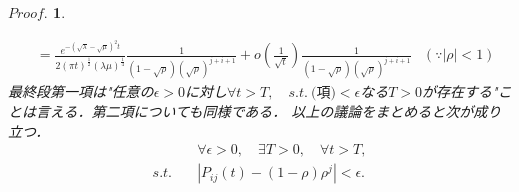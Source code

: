 \documentclass[a4j,papersize,disablejfam,slide,14pt]{jsarticle}
\newtheorem{Proof}{$Proof.$}
\def\exp#1{e^{#1}} %
\begin{document}
\begin{Proof}
\begin{description}
\begin{align}
                    &= \frac{ \exp{-(\sqrt{\lambda}-\sqrt{\mu})^2 t} }{ 2(\pi t)^\frac{1}{2} (\lambda \mu)^\frac{1}{4} } \frac{1}{(1-\sqrt{\rho})(\sqrt{\rho})^{j+i+1}} 
                    	+ o\left( \frac{1}{\sqrt{t}} \right) \frac{1}{(1-\sqrt{\rho})(\sqrt{\rho})^{j+i+1}} & (\because |\rho| < 1)
                \end{align}
                最終段第一項は"任意の$\epsilon > 0$に対し$\forall t > T,\quad s.t.\ \mbox{(項)} < \epsilon$なる$T > 0$が存在する"ことは言える．第二項についても同様である．
                以上の議論をまとめると次が成り立つ．
                \begin{align}
                	&\forall \epsilon > 0,\quad \exists T > 0,\quad \forall t > T, \\
                	s.t.\quad& \left| P_{ij}(t) - (1-\rho)\rho^j \right| < \epsilon.
                \end{align}
            

\end{description}
\end{Proof}
\end{document}
